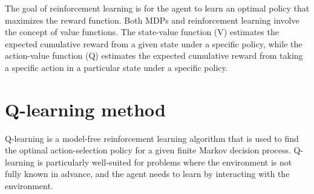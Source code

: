 \documentclass[a4paper,12pt,answers]{article}
\begin{document}
	\noindent
	The goal of reinforcement learning is for the agent to learn an optimal policy that maximizes the reward function.
	Both MDPs and reinforcement learning involve the concept of value functions. The state-value function (V) estimates the expected cumulative reward from a given state under a specific policy, while the action-value function (Q) estimates the expected cumulative reward from taking a specific action in a particular state under a specific policy.
	
	
	
	\newpage
	\section{Q-learning method}
	Q-learning is a model-free reinforcement learning algorithm that is used to find the optimal action-selection policy for a given finite Markov decision process. Q-learning is particularly well-suited for problems where the environment is not fully known in advance, and the agent needs to learn by interacting with the environment.
	
\end{document}
